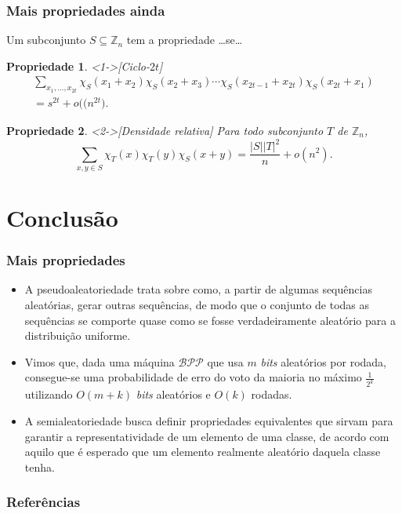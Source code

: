 \documentclass{beamer}
\def\MMZ{\mathbb{Z}} %
\def\MMp{\mathrm{.}} %
\def\clBPP{\mathcal{BPP}}
\theoremstyle{teoaxicorlem}
\newtheorem{Propr}{Propriedade}
\theoremstyle{defnotnom}
\begin{document}
\begin{frame}
  \frametitle{Mais propriedades ainda}
  Um subconjunto $S\subseteq\MMZ_n$ tem a propriedade \dots se\dots
  \begin{Propr}<1->[Ciclo-$2t$]
    \begin{equation*}
      \begin{gathered}
        \sum_{x_1,\dotsc,x_{2t}}\chi_S(x_1+x_2)\chi_S(x_2+x_3)\dotsb
        \chi_S(x_{2t-1}+x_{2t})\chi_S(x_{2t}+x_1) \\
        = s^{2t}+o\bigl((n^{2t}\bigr)\MMp
      \end{gathered}
    \end{equation*}
  \end{Propr}
  \vfill
  \begin{Propr}<2->[Densidade relativa]
    Para todo subconjunto $T$ de $\MMZ_n$,
    \begin{equation*}
      \sum_{x,y\in S}\chi_T(x)\chi_T(y)\chi_S(x+y) =
      \frac{|S||T|^2}{n}+o(n^2)\MMp
    \end{equation*}
  \end{Propr}
\end{frame}

\section{Conclusão}

\begin{frame}
  \frametitle{Mais propriedades}
  \begin{itemize}
    \item A pseudoaleatoriedade trata sobre como, a partir de algumas
      sequências aleatórias, gerar outras sequências, de modo que
      o conjunto
      de todas as sequências se comporte quase
      como se fosse verdadeiramente
      aleatório para a distribuição uniforme.\pause
    \item Vimos que, dada uma máquina $\clBPP$ que usa $m$
      \textit{bits} aleatórios por
      rodada, consegue-se uma probabilidade de erro do voto da maioria
      no      máximo $\frac{1}{2^k}$ utilizando $O(m+k)$ \textit{bits}
      aleatórios      e      $O(k)$ rodadas.\pause
    \item A semialeatoriedade busca definir propriedades equivalentes
      que sirvam para garantir a representatividade de um elemento de
      uma classe, de acordo com aquilo que é esperado que um elemento
      realmente aleatório daquela classe tenha.
  \end{itemize}
\end{frame}

\begin{frame}
  \frametitle{Referências}
  \nocite{Quasi-random-subsets}
  \nocite{Quasi-random-graphs}
  \nocite{Chazelle-2000}
  
  
\end{frame}
\end{document}
